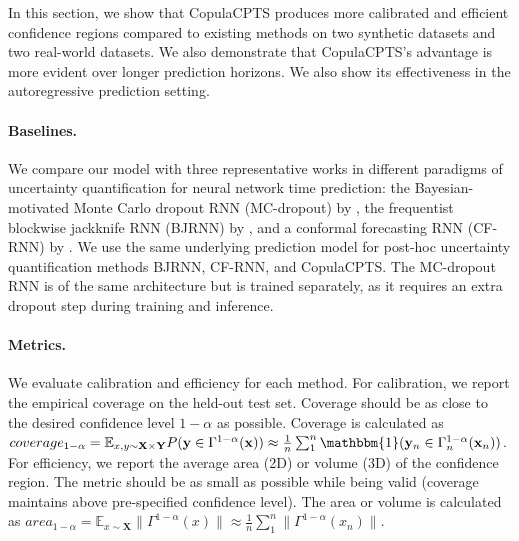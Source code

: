 In this section, we show that CopulaCPTS produces more calibrated and efficient confidence regions compared to existing methods on two synthetic datasets and two real-world datasets. We also demonstrate that CopulaCPTS's advantage is more evident over longer prediction horizons. We also show its effectiveness in the autoregressive prediction setting.

\paragraph{Baselines.} We compare our model with three representative works in different paradigms of uncertainty quantification for neural network time  prediction: the Bayesian-motivated Monte Carlo dropout RNN (MC-dropout) by \cite{gal2016dropout}, the frequentist blockwise jackknife RNN (BJRNN) by \cite{bjrnn}, and a conformal forecasting RNN (CF-RNN) by \cite{Schaar2021conformaltime}. We use the same underlying prediction model for post-hoc uncertainty quantification methods BJRNN, CF-RNN, and CopulaCPTS. The MC-dropout RNN is of the same architecture but is trained separately, as it requires an extra dropout step during training and inference. 

\paragraph{Metrics.}
We evaluate calibration and efficiency for each method. For calibration, we report the empirical coverage on the held-out test set. Coverage should be as close to the desired confidence level $1-\alpha$ as possible. Coverage is calculated as $coverage_{1-\alpha} =  \mathbb{E}_{x,y \sim \mathbf{X} \edit{\times} \mathbf{Y}} P(\mathbf{y} \in \Gamma^{1-\alpha}(\mathbf{x})) \approx \frac{1}{n} \sum^n_1 \mathbbm{1} (\mathbf{y}_n \in \Gamma^{1-\alpha}_n(\mathbf{x}_n)\edit{)}$. For efficiency, we report the average area (2D) or volume (3D) of the confidence region. The metric should be as small as possible while being valid (coverage maintains above pre-specified confidence level). The area or volume is calculated as $area_{1-\alpha} = \mathbb{E}_{x \sim \mathbf{X}} \|\Gamma^{1-\alpha}(x)\|  \approx \frac{1}{n} \sum^n_1 \|\Gamma^{1-\alpha}(x_n)\|$.


